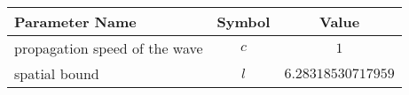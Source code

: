 \begin{tabular}{lcc}
\hline
 Parameter Name                &  Symbol  &       Value        \\
\hline
 propagation speed of the wave &   $c$    &        $1$         \\
 spatial bound                 &   $l$    & $6.28318530717959$ \\
\hline
\end{tabular}